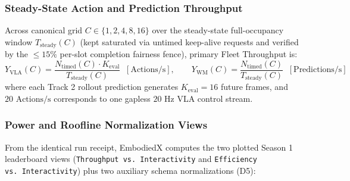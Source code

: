 \documentclass[10pt,letterpaper]{article}
\begin{document}
\subsubsection{Steady-State Action and Prediction Throughput}
Across canonical grid $C \in \{1, 2, 4, 8, 16\}$ over the steady-state full-occupancy window $T_{\text{steady}}(C)$ (kept saturated via untimed keep-alive requests and verified by the $\le 15\%$ per-slot completion fairness fence), primary Fleet Throughput is:
\begin{equation}
    Y_{\text{VLA}}(C) = \frac{N_{\text{timed}}(C) \cdot K_{\text{eval}}}{T_{\text{steady}}(C)} \;\; [\text{Actions/s}], \qquad Y_{\text{WM}}(C) = \frac{N_{\text{timed}}(C)}{T_{\text{steady}}(C)} \;\; [\text{Predictions/s}]
\end{equation}
where each Track 2 rollout prediction generates $K_{\text{eval}} = 16$ future frames, and $20\text{ Actions/s}$ corresponds to one gapless $20\text{ Hz}$ VLA control stream.

\subsubsection{Power and Roofline Normalization Views}
From the identical run receipt, EmbodiedX computes the two plotted Season 1 leaderboard views (\texttt{Throughput vs.\ Interactivity} and \texttt{Efficiency vs.\ Interactivity}) plus two auxiliary schema normalizations (D5):
\end{document}
